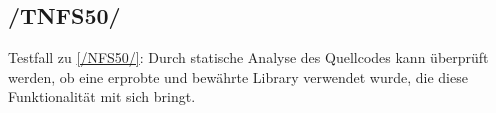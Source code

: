 \subsection*{/TNFS50/}
\label{/TNFS50/} Testfall zu \ref{/NFS50/}: Durch \gls{statische Analyse} des \Gls{Quellcode}s kann überprüft werden, ob eine erprobte und bewährte \Gls{Library} verwendet wurde,
die diese Funktionalität mit sich bringt.